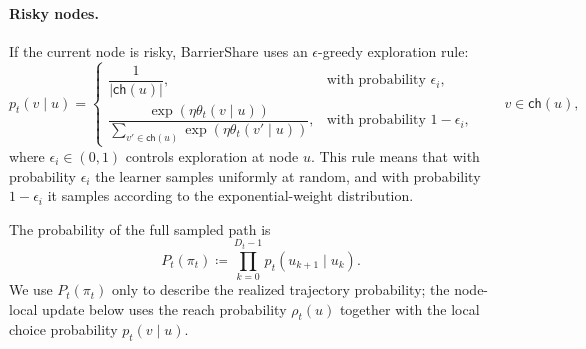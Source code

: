 \paragraph{Risky nodes.}
If the current node is risky, BarrierShare uses an $\epsilon$-greedy exploration rule:
\begin{equation}
    p_t(v\mid u)
    =
    \begin{cases}
    \dfrac{1}{|\mathsf{ch}(u)|}, & \text{with probability } \epsilon_i, \\[8pt]
    \dfrac{\exp(\eta \theta_t(v\mid u))}{\sum_{v' \in \mathsf{ch}(u)} \exp(\eta \theta_t(v'\mid u))}, & \text{with probability } 1-\epsilon_i,
    \end{cases}
    \qquad v \in \mathsf{ch}(u),
    \label{eq:risky_selection}
\end{equation}
where $\epsilon_i \in (0,1)$ controls exploration at node $u$. This rule means that with probability $\epsilon_i$ the learner samples uniformly at random, and with probability $1-\epsilon_i$ it samples according to the exponential-weight distribution.

The probability of the full sampled path is
\begin{equation}
    P_t(\pi_t) \coloneqq \prod_{k=0}^{D_t-1} p_t(u_{k+1}\mid u_k).
    \label{eq:path_prob}
\end{equation}
We use $P_t(\pi_t)$ only to describe the realized trajectory probability; the node-local update below uses the reach probability $\rho_t(u)$ together with the local choice probability $p_t(v\mid u)$.

